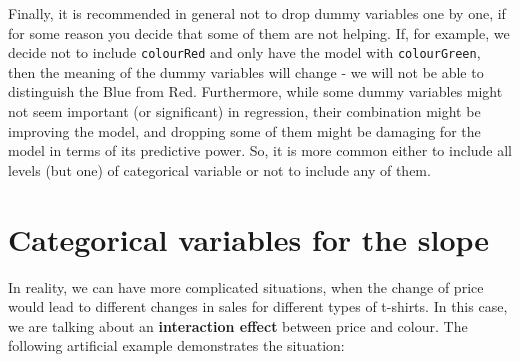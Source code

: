 \documentclass[
]{book}
\theoremstyle{definition}
\theoremstyle{definition}
\theoremstyle{definition}
\theoremstyle{definition}
\theoremstyle{remark}
\begin{document}
Finally, it is recommended in general not to drop dummy variables one by one, if for some reason you decide that some of them are not helping. If, for example, we decide not to include \texttt{colourRed} and only have the model with \texttt{colourGreen}, then the meaning of the dummy variables will change - we will not be able to distinguish the Blue from Red. Furthermore, while some dummy variables might not seem important (or significant) in regression, their combination might be improving the model, and dropping some of them might be damaging for the model in terms of its predictive power. So, it is more common either to include all levels (but one) of categorical variable or not to include any of them.

\section{Categorical variables for the slope}\label{categorical-variables-for-the-slope}

In reality, we can have more complicated situations, when the change of price would lead to different changes in sales for different types of t-shirts. In this case, we are talking about an \textbf{interaction effect} between price and colour. The following artificial example demonstrates the situation:
\end{document}
